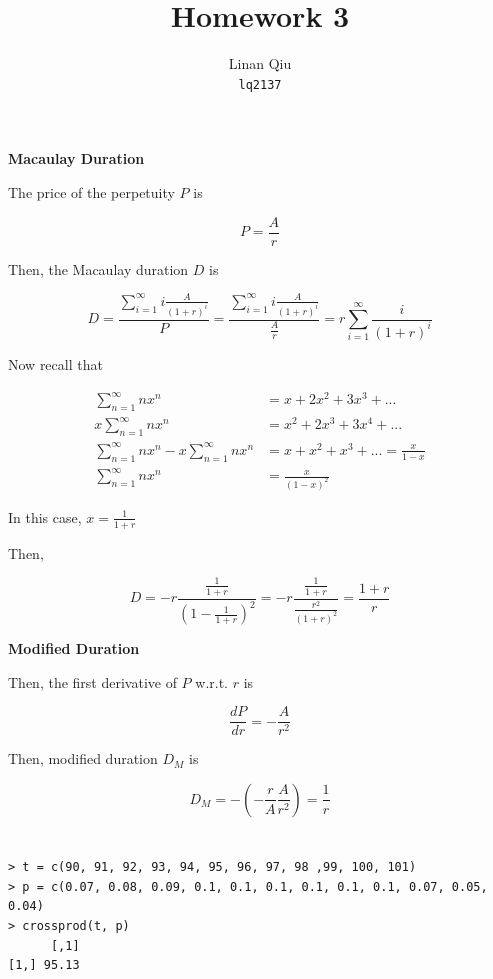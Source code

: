 \documentclass[11pt]{scrartcl}
\title{Homework 3}
\author{Linan Qiu\\\texttt{lq2137}}
\begin{document}
\maketitle

\section{}

\textbf{Macaulay Duration}

The price of the perpetuity $P$ is

\[P = \frac{A}{r}\]

Then, the Macaulay duration $D$ is

\[D = \frac{\sum_{i=1}^\infty i\frac{A}{(1+r)^i}}{P} = \frac{\sum_{i=1}^\infty i\frac{A}{(1+r)^i}}{\frac{A}{r}} = r\sum_{i=1}^\infty \frac{i}{(1+r)^i}\]

Now recall that

\begin{align*}
\sum_{n=1}^\infty nx^n &= x + 2x^2 + 3x^3 + ... \\
x\sum_{n=1}^\infty nx^n &= x^2 + 2x^3 + 3x^4 + ... \\
\sum_{n=1}^\infty nx^n - x\sum_{n=1}^\infty nx^n &= x + x^2 + x^3 + ... = \frac{x}{1-x} \\
\sum_{n=1}^\infty nx^n &= \frac{x}{(1-x)^2}
\end{align*}

In this case, $x = \frac{1}{1+r}$

Then,

\[D = -r \frac{\frac{1}{1+r}}{\left(1-\frac{1}{1+r}\right)^2} = -r \frac{\frac{1}{1+r}}{\frac{r^2}{(1+r)^2}} = \frac{1+r}{r}\]

\textbf{Modified Duration}

Then, the first derivative of $P$ w.r.t. $r$ is

\[\frac{dP}{dr} = -\frac{A}{r^2}\]

Then, modified duration $D_M$ is

\[D_M = - \left(-\frac{r}{A} \frac{A}{r^2}\right) = \frac{1}{r}\]

\section{}

\subsection{}

\begin{lstlisting}
> t = c(90, 91, 92, 93, 94, 95, 96, 97, 98 ,99, 100, 101)
> p = c(0.07, 0.08, 0.09, 0.1, 0.1, 0.1, 0.1, 0.1, 0.1, 0.07, 0.05, 0.04)
> crossprod(t, p)
      [,1]
[1,] 95.13
\end{lstlisting}
\end{document}
